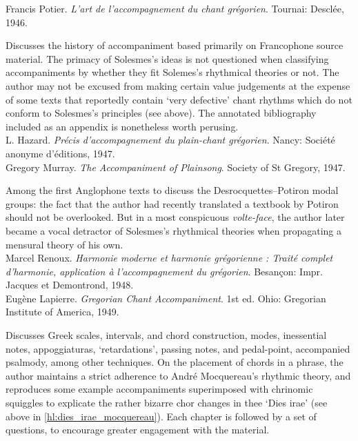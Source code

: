     \parindent=0pt
    \hangindent=0pt
  Francis Potier. \emph{L'art de l'accompagnement du chant grégorien}. Tournai:  Desclée, 1946.

     \parindent=20pt
     \hangindent=20pt
     Discusses the history of accompaniment based primarily on Francophone source material. The primacy of Solesmes's ideas is not questioned when classifying accompaniments by whether they fit Solemes's rhythmical theories or not. The author may not be excused from making certain value judgements at the expense of some texts that reportedly contain `very defective' chant rhythms which do not conform to Solesmes's principles (see  above). The annotated bibliography included as an appendix is nonetheless worth perusing.\\

    \parindent=0pt
    \hangindent=0pt
  \covid{}L. Hazard. \emph{Précis d'accompagnement du plain-chant grégorien}. Nancy:  Société anonyme d'éditions, 1947. \\

    \parindent=0pt
    \hangindent=0pt
  Gregory Murray. \emph{The Accompaniment of Plainsong}. Society of St Gregory, 1947.

     \parindent=20pt
     \hangindent=20pt
     Among the first Anglophone texts to discuss the Desrocquettes--Potiron modal groups: the fact that the author had recently translated a textbook by Potiron should not be overlooked. But in a most conspicuous \emph{volte-face}, the author later became a vocal detractor of Solesmes's rhythmical theories when propagating a mensural theory of his own.\\

    \parindent=0pt
    \hangindent=0pt
  \covid{}Marcel Renoux. \emph{Harmonie moderne et harmonie grégorienne : Traité complet d'harmonie, application à l'accompagnement du grégorien}. Besançon:  Impr. Jacques et Demontrond, 1948. \\

    \parindent=0pt
    \hangindent=0pt
  Eugène Lapierre. \emph{Gregorian Chant Accompaniment}. 1st ed. Ohio:  Gregorian Institute of America, 1949.

     \parindent=20pt
     \hangindent=20pt
     Discusses Greek scales, intervals, and chord construction, modes, inessential notes, appoggiaturas, `retardations', passing notes, and pedal-point, accompanied psalmody, among other techniques. On the placement of chords in a phrase, the author maintains a strict adherence to André Mocquereau's rhythmic theory, and reproduces some example accompaniments superimposed with chrinomic squiggles to explicate the rather bizarre chor changes in thee `Dies irae' (see above in \cref{hl:dies_irae_mocquereau}). Each chapter is followed by a set of questions, to encourage greater engagement with the material. \\

